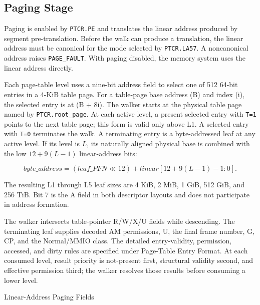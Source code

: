 \subsection{Paging Stage}

Paging is enabled by \texttt{PTCR.PE} and translates the linear address produced by segment pre-translation. Before
the walk can produce a translation, the linear address must be canonical for the mode selected by
\texttt{PTCR.LA57}. A noncanonical address raises \texttt{PAGE\_FAULT}. With paging disabled, the memory system uses
the linear address directly.

Each page-table level uses a nine-bit address field to select one of 512 64-bit entries in a 4-KiB table page. For a
table-page base address (B) and index (i), the selected entry is at (B + 8i). The walker starts at the physical
table page named by \texttt{PTCR.root\_page}. At each active level, a present selected entry with \texttt{T=1} points to the
next table page; this form is valid only above L1. A selected entry with \texttt{T=0} terminates the walk. A
terminating entry is a byte-addressed leaf at any active level. If its level is $L$, its naturally
aligned physical base is combined with the low $12+9(L-1)$ linear-address bits:

\[
  \mathit{byte\_address} = (\mathit{leaf\_PFN} \ll 12) +
  \mathit{linear}[12+9(L-1)-1:0].
\]

The resulting L1 through L5 leaf sizes are 4 KiB, 2 MiB, 1 GiB, 512 GiB, and 256 TiB. Bit 7 is the A field in both
descriptor layouts and does not participate in address formation.

The walker intersects table-pointer R/W/X/U fields while descending. The
terminating leaf supplies decoded AM permissions, U, the final frame number,
G, CP, and the Normal/MMIO class. The detailed entry-validity,
permission, accessed, and dirty rules are specified under Page-Table Entry Format. At each consumed level, result
priority is not-present first, structural validity second, and effective permission third; the walker resolves
those results before consuming a lower level.

\begin{manuallistedformatdiagram}{Linear-Address Paging Fields}
\end{manuallistedformatdiagram}

